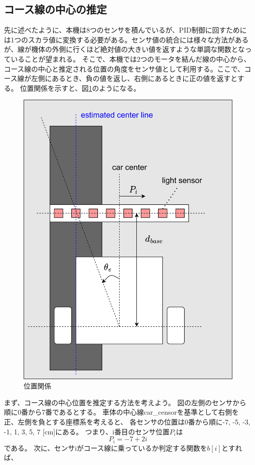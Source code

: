 \documentclass{ltjsreport}
\begin{document}
\subsection{コース線の中心の推定}
先に述べたように、本機は8つのセンサを積んでいるが、PID制御に回すためには1つのスカラ値に変換する必要がある。センサ値の統合には様々な方法があるが、線が機体の外側に行くほど絶対値の大きい値を返すような単調な関数となっていることが望まれる。
そこで、本機では2つのモータを結んだ線の中心から、コース線の中心と推定される位置の角度をセンサ値として利用する。ここで、コース線が左側にあるとき、負の値を返し、右側にあるときに正の値を返すとする。
位置関係を示すと、図\ref{fig:linepos}のようになる。
\begin{figure}[bt]
  \centering
  \includegraphics[keepaspectratio, scale=0.05]
       {img/sensor_theta.drawio.png}
  \caption{位置関係}
  \label{fig:linepos}
 \end{figure}


まず、コース線の中心位置を推定する方法を考えよう。
図の左側のセンサから順に0番から7番であるとする。
車体の中心線car\_censorを基準として右側を正、左側を負とする座標系を考えると、
各センサの位置は0番から順に-7, -5, -3, -1, 1, 3, 5, 7 [cm]にある。
つまり、i番目のセンサ位置$P_i$は
\[ 
      P_i = -7 + 2i
\]
である。
次に、センサiがコース線に乗っているか判定する関数を$b[i]$とすれば、
\end{document}
